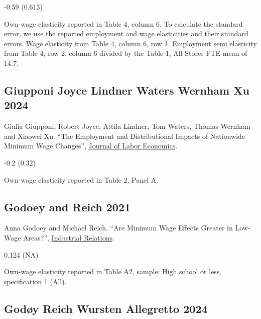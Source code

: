  -0.59 (0.613)

\vspace{0.7em}

 Own-wage elasticity reported in Table 4, column 6. To calculate the standard error, we use the reported employment and wage elasticities and their standard errors. Wage elasticity from Table 4, column 6, row 1. Employment semi elasticity from Table 4, row 2, column 6 divided by the Table 1, All Stores FTE mean of 14.7.

\subsection*{Giupponi Joyce Lindner Waters Wernham Xu 2024}
\vspace{-0.7em}

\noindent Giulia Giupponi, Robert Joyce, Attila Lindner, Tom Waters, Thomas Wernham and Xiaowei Xu. ``The Employment and Distributional Impacts of Nationwide Minimum Wage Changes'', \href{https://doi.org/10.1086/728471}{Journal of Labor Economics}.

\vspace{0.7em}

 -0.2 (0.32)

\vspace{0.7em}

 Own-wage elasticity reported in Table 2, Panel A.

\subsection*{Godoey and Reich 2021}
\vspace{-0.7em}

\noindent Anna Godoey and Michael Reich. ``Are Minimum Wage Effects Greater in Low-Wage Areas?'', \href{https://doi.org/10.1111/irel.12267}{Industrial Relations}.

\vspace{0.7em}

 0.124 (NA)

\vspace{0.7em}

 Own-wage elasticity reported in Table A2, sample: High school or less, specification 1 (All).

\subsection*{Godøy Reich Wursten Allegretto 2024}
\vspace{-0.7em}

